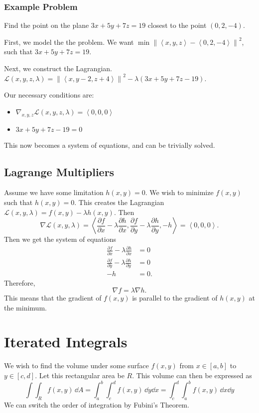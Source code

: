 \documentclass[12pt]{article}
\theoremstyle{plain} %
\theoremstyle{definition}
\theoremstyle{definition}
\theoremstyle{definition}
\theoremstyle{remark}
\newcommand{\Lagr}{\mathcal{L}}
\newcommand{\angled}[1]{\left\langle {#1} \right\rangle}
\renewcommand{\norm}[1]{\left\lVert#1\right\rVert}
\begin{document}
\subsubsection{Example Problem}
Find the point on the plane $3x+5y+7z=19$ closest to the point $\left( 0,2,-4 \right)$.

First, we model the the problem. We want $\min \norm{\angled{x,y,z}-\angled{0,2,-4}}^2$, such that $3x+5y+7z=19$.

Next, we construct the Lagrangian.
$\Lagr(x,y,z,\lambda) = \norm{\angled{x,y-2,z+4}}^2 - \lambda (3x+5y+7z-19)$.

Our necessary conditions are:
\begin{itemize}
    \item $\nabla_{x,y,z} \Lagr(x,y,z,\lambda) = \angled{0,0,0}$
    \item $3x+5y+7z-19=0$
\end{itemize}
This now becomes a system of equations, and can be trivially solved.

\subsection{Lagrange Multipliers}
Assume we have some limitation $h(x,y)=0.$ We wish to minimize $f(x,y)$ such that $h(x,y)=0$. This creates the Lagrangian $\Lagr(x,y,\lambda) = f(x,y)-\lambda h(x,y)$. Then
\[ \nabla \Lagr(x,y,\lambda) = \angled{\frac{\partial f}{\partial x} - \lambda \frac{\partial h}{\partial x}, \frac{\partial f}{\partial y} - \lambda \frac{\partial h}{\partial y}, -h} = \angled{0,0,0}.\]
Then we get the system of equations
\begin{align*}
    \frac{\partial f}{\partial x} - \lambda \frac{\partial h}{\partial x} &= 0 \\
    \frac{\partial f}{\partial y} - \lambda \frac{\partial h}{\partial y} &= 0 \\
    -h &= 0.
\end{align*}
Therefore,
\[ \nabla f = \lambda \nabla h. \]
This means that the gradient of $f(x,y)$ is parallel to the gradient of $h(x,y)$ at the minimum.

\section{Iterated Integrals}
We wish to find the volume under some surface $f(x,y)$ from $x \in \left[a,b\right]$ to $y \in \left[c,d\right]$. Let this rectangular area be $R$. This volume can then be expressed as
\[ \int \int_R f(x,y) \, \dd{A} = \int_a^b \int_c^d f(x,y) \, \dd{y} \dd{x} = \int_c^d \int_a^b f(x,y) \, \dd{x} \dd{y}\]
We can switch the order of integration by Fubini's Theorem.
\end{document}
